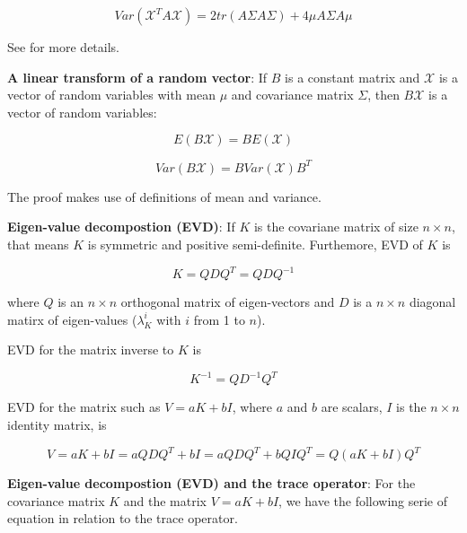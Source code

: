 \documentclass[]{book}
\theoremstyle{definition}
\theoremstyle{definition}
\theoremstyle{definition}
\theoremstyle{remark}
\begin{document}
\begin{equation} 
Var(\mathcal{X}^T A \mathcal{X}) = 2tr(A \Sigma A \Sigma) + 4\mu A \Sigma A \mu
\label{eq:quadform2}
\end{equation}

See \citep[Appendix 3, pp.~843]{Lynch1998} for more details.

\textbf{A linear transform of a random vector}: If \(B\) is a constant
matrix and \(\mathcal{X}\) is a vector of random variables with mean
\(\mu\) and covariance matrix \(\Sigma\), then \(B \mathcal{X}\) is a
vector of random variables:

\begin{equation} 
E(B \mathcal{X}) = B E(\mathcal{X})
\label{eq:matvec1}
\end{equation}

\begin{equation} 
Var(B \mathcal{X}) = B Var(\mathcal{X}) B^T
\label{eq:matvec2}
\end{equation}

The proof makes use of definitions of mean and variance.

\textbf{Eigen-value decompostion (EVD)}: If \(K\) is the covariane
matrix of size \(n \times n\), that means \(K\) is symmetric and
positive semi-definite. Furthemore, EVD of \(K\) is

\begin{equation} 
K = Q D Q^T = Q D Q^{-1}
\label{eq:evdk}
\end{equation}

where \(Q\) is an \(n \times n\) orthogonal matrix of eigen-vectors and
\(D\) is a \(n \times n\) diagonal matirx of eigen-values
(\(\lambda_{K}^i\) with \(i\) from 1 to \(n\)).

EVD for the matrix inverse to \(K\) is

\begin{equation} 
K^{-1} = Q D^{-1} Q^T
\label{eq:evdkinv}
\end{equation}

EVD for the matrix such as \(V = a K + b I\), where \(a\) and \(b\) are
scalars, \(I\) is the \(n \times n\) identity matrix, is

\begin{equation} 
V = a K + b I = a Q D Q^T + b I = a Q D Q^T + b Q I Q^T = Q (a K + b I) Q^T
\label{eq:evdkinv}
\end{equation}

\textbf{Eigen-value decompostion (EVD) and the trace operator}: For the
covariance matrix \(K\) and the matrix \(V = a K + b I\), we have the
following serie of equation in relation to the trace operator.
\end{document}
